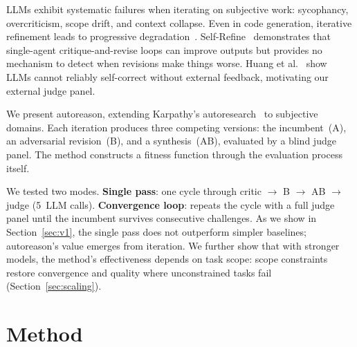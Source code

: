 \documentclass[10pt,twocolumn]{article}
\begin{document}
LLMs exhibit systematic failures when iterating on subjective work: sycophancy, overcriticism, scope drift, and context collapse. Even in code generation, iterative refinement leads to progressive degradation~\cite{slopcodebench}. Self-Refine~\cite{selfrefine} demonstrates that single-agent critique-and-revise loops can improve outputs but provides no mechanism to detect when revisions make things worse. Huang et al.~\cite{huang2023} show LLMs cannot reliably self-correct without external feedback, motivating our external judge panel.

We present autoreason, extending Karpathy's autoresearch~\cite{autoresearch} to subjective domains. Each iteration produces three competing versions: the incumbent~(A), an adversarial revision~(B), and a synthesis~(AB), evaluated by a blind judge panel. The method constructs a fitness function through the evaluation process itself.

We tested two modes. \textbf{Single pass}: one cycle through critic $\to$ B $\to$ AB $\to$ judge (5~LLM calls). \textbf{Convergence loop}: repeats the cycle with a full judge panel until the incumbent survives consecutive challenges. As we show in Section~\ref{sec:v1}, the single pass does not outperform simpler baselines; autoreason's value emerges from iteration. We further show that with stronger models, the method's effectiveness depends on task scope: scope constraints restore convergence and quality where unconstrained tasks fail (Section~\ref{sec:scaling}).

\section{Method}
\end{document}
